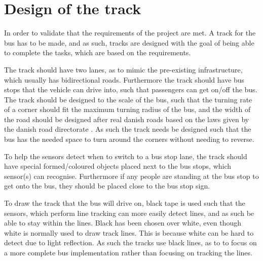 \section{Design of the track} 

In order to validate that the requirements of the project are met. A track for the bus has to be made, and as such, tracks are designed with the goal of being able to complete the tasks, which are based on the requirements.

The track should have two lanes, as to mimic the pre-existing infrastructure, which usually has bidirectional roads. Furthermore the track should have bus stops that the vehicle can drive into, such that passengers can get on/off the bus.
The track should be designed to the scale of the bus, such that the turning rate of a corner should fit the maximum turning radius of the bus, and the width of the road should be designed after real danish roads based on the laws given by the danish road directorate \cite{roadRules}\cite{DriveingCurves}. As such the track needs be designed such that the bus has the needed space to turn around the corners without needing to reverse.

To help the sensors detect when to switch to a bus stop lane, the track should have special formed/coloured objects placed next to the bus stops, which sensor(s) can recognise. Furthermore if any people are standing at the bus stop to get onto the bus, they should be placed close to the bus stop sign.

To draw the track that the bus will drive on, black tape is used such that the sensors, which perform line tracking can more easily detect lines, and as such be able to stay within the lines. Black has been chosen over white, even though white is normally used to draw track lines. This is because white can be hard to detect due to light reflection. As such the tracks use black lines, as to to focus on a more complete bus implementation rather than focusing on tracking the lines.
